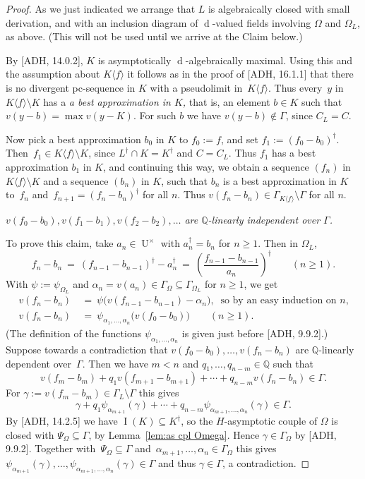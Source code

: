 \documentclass[]{amsart}
\numberwithin{equation}{section}
\newcommand{\bbold}{\mathbb}
\def\Q { {\bbold Q} }
\def \I{\operatorname{I}}
\def \Univ {{\operatorname{U}}}
\def \d{\operatorname{d}}
\newcommand{\claim}[2][\!\!]{\medskip\noindent {\bf Claim #1:} {\it #2}\medskip}
\theoremstyle{definition}
\theoremstyle{remark}
\renewcommand\geq{\geqslant}
\renewcommand\ge{\geq}
\begin{document}
\begin{proof} As we just indicated we arrange that $L$ is algebraically closed with small derivation,  and with an inclusion diagram of $\d$-valued fields involving $\Omega$ and $\Omega_L$, as above. (This will not be used until we arrive at the Claim below.) 


By [ADH, 14.0.2], $K$ is asymptotically $\d$-algebraically maximal. Using this and the assumption about $K\langle f\rangle$ it follows
as in the proof of [ADH, 16.1.1] that
there is no divergent pc-sequence in $K$
with a pseudolimit in~$K\langle f\rangle$. Thus every~$y$ in~$K\langle f \rangle \setminus K$ has a 
 {\it a  best approximation in $K$,}\/ that is, an element $b\in K$ such that  $v(y-b)=\max v(y-K)$.
For such $b$ we have $v(y-b)\notin \Gamma$, since $C_L=C$. 

 
Now pick a best approximation $b_0$ in $K$ to $f_0:=f$, and set
$f_1:= (f_0-b_0)^\dagger$. Then~$f_1\in K\langle f\rangle \setminus K$, since $L^\dagger\cap K=K^\dagger$ and $C=C_L$. Thus
$f_1$ has a best approximation $b_1$ in $K$, and continuing this way, we
obtain a sequence $(f_n)$ in~${K\langle f \rangle\setminus K}$ and a sequence
$(b_n)$ in $K$, such that $b_n$ is a best approximation in $K$ to~$f_n$ and~$f_{n+1}=(f_n-b_n)^\dagger$ for all $n$. Thus
$v(f_n-b_n)\in \Gamma_{K\langle f \rangle}\setminus \Gamma$ for all $n$. 

\claim{$v(f_0-b_0),v(f_1-b_1), v(f_2-b_2),\dots$ are $\Q$-linearly independent over $\Gamma$.}

\noindent
To prove this claim, take $a_n\in \Univ^\times$ with $a_n^\dagger=b_n$ for
$n\ge 1$. Then in $\Omega_L$,
$$f_n-b_n\ =\ (f_{n-1}-b_{n-1})^\dagger-a_n^\dagger\ =\ \left(\frac{f_{n-1}-b_{n-1}}{a_n}\right)^\dagger \qquad (n\ge 1).$$
With $\psi:= \psi_{\Omega_L}$ and $\alpha_n=v(a_n)\in \Gamma_{\Omega}\subseteq \Gamma_{\Omega_L}$ for $n\ge 1$, we get 
\begin{align*} v(f_n-b_n)\ &=\ \psi\big(v(f_{n-1}-b_{n-1})-\alpha_n\big),\ 
 \text{ so by an easy induction on $n$,}\\
 v(f_n-b_n)\ &=\ \psi_{\alpha_1,\dots, \alpha_n}\big(v(f_0-b_0)\big)   \qquad (n\ge 1).
 \end{align*} 
 (The definition of the functions $\psi_{\alpha_1,\dots, \alpha_n}$ is given just before [ADH, 9.9.2].)
Suppose towards a contradiction that $v(f_0-b_0), \dots, v(f_n-b_n)$ are $\Q$-linearly dependent
over~$\Gamma$. Then we have $m<n$ and $q_1,\dots, q_{n-m}\in \Q$ such that
$$v(f_m-b_m) + q_1v(f_{m+1}-b_{m+1}) + \cdots + q_{n-m}v(f_n-b_n)\in \Gamma.$$ 
For $\gamma:= v(f_m-b_m)\in \Gamma_L\setminus\Gamma$ this gives
$$\gamma + q_1\psi_{\alpha_{m+1}}(\gamma) + \cdots + q_{n-m}\psi_{\alpha_{m+1},\dots,\alpha_n}(\gamma)\in \Gamma.$$
By [ADH, 14.2.5] we have $\I(K)\subseteq K^\dagger$,  so the $H$-asymptotic couple of $\Omega$ is closed  with $\Psi_\Omega\subseteq\Gamma$, by Lemma~\ref{lem:as cpl Omega}. 
 Hence $\gamma\in\Gamma_\Omega$ by [ADH, 9.9.2].
 Together with~$\Psi_\Omega\subseteq\Gamma$ and~$\alpha_{m+1},\dots,\alpha_n\in\Gamma_\Omega$ this gives 
$\psi_{\alpha_{m+1}}(\gamma),\dots, \psi_{\alpha_{m+1},\dots,\alpha_n}(\gamma)\in\Gamma$
and thus $\gamma\in\Gamma$, a contradiction.
\end{proof}
\end{document}
